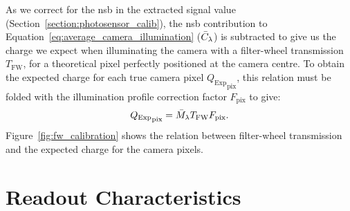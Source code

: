 As we correct for the \gls{nsb} in the extracted signal value (Section~\ref{section:photosensor_calib}), the \gls{nsb} contribution to Equation~\ref{eq:average_camera_illumination} ($\bar{C}_\lambda$) is subtracted to give us the charge we expect when illuminating the camera with a filter-wheel transmission $T_\text{FW}$, for a theoretical pixel perfectly positioned at the camera centre. To obtain the expected charge for each true camera pixel ${Q_\text{Exp}}_\text{pix}$, this relation must be folded with the illumination profile correction factor $F_\text{pix}$ to give:
\begin{equation} \label{eq:average_camera_illumination}
{Q_\text{Exp}}_\text{pix} = \bar{M}_\lambda T_\text{FW}F_\text{pix}.
\end{equation}
Figure~\ref{fig:fw_calibration} shows the relation between filter-wheel transmission and the expected charge for the camera pixels.

\section{Readout Characteristics}


